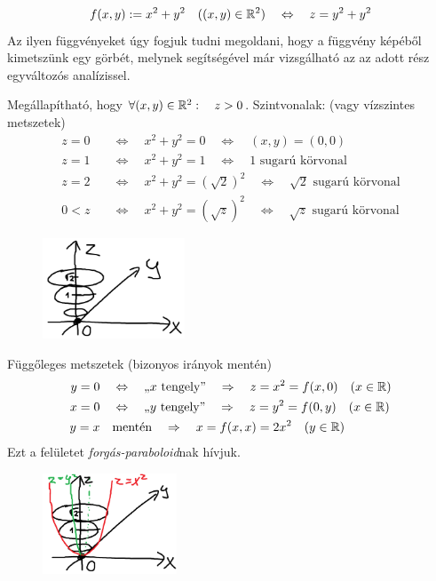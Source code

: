 \documentclass[a4paper,11.5pt]{article}
\begin{document}
	\begin{task}
		\[ f(x,y):=x^2+y^2\quad ((x,y)\in\mathbb{R}^2)\quad \Leftrightarrow\quad z=y^2+y^2 \]
		Az ilyen függvényeket úgy fogjuk tudni megoldani, hogy a függvény képéből kimetszünk egy görbét, melynek segítségével már vizsgálható az az adott rész egyváltozós analízissel.
		
		\medskip
		Megállapítható, hogy $\forall (x,y)\in\mathbb{R}^2:\quad z>0$.
		\smallskip
		Szintvonalak: (vagy vízszintes metszetek)
		\begin{align*}
			z=0&\quad \Leftrightarrow\quad x^2+y^2=0\quad \Leftrightarrow\quad (x,y)=(0,0) \\
			z=1&\quad \Leftrightarrow\quad x^2+y^2=1\quad \Leftrightarrow\quad \text{1 sugarú körvonal} \\
			z=2&\quad \Leftrightarrow\quad x^2+y^2=(\sqrt{2})^2\quad \Leftrightarrow\quad \text{$\sqrt{2}$ sugarú körvonal} \\
			0<z&\quad \Leftrightarrow\quad x^2+y^2=(\sqrt{z})^2\quad \Leftrightarrow\quad \sqrt{z}\text{ sugarú körvonal} 
		\end{align*}
		\begin{figure}[H]
			\centering
			\includegraphics[height=3cm]{../2zh/kepek/18.png}
			\caption{}
		\end{figure}
		Függőleges metszetek (bizonyos irányok mentén)
		\begin{align*}
			y=0&\quad \Leftrightarrow\quad \text{,,$x$ tengely''}\quad \Rightarrow\quad z=x^2=f(x,0)\quad (x\in\mathbb{R}) \\
			x=0&\quad \Leftrightarrow\quad \text{,,$y$ tengely''}\quad \Rightarrow\quad z=y^2=f(0,y)\quad (x\in\mathbb{R}) \\
			y=x&\quad \text{mentén}\quad \Rightarrow\quad x=f(x,x)=2x^2\quad (y\in\mathbb{R}) 
		\end{align*}
		Ezt a felületet \textit{forgás-paraboloid}nak hívjuk.
		\begin{figure}[H]
			\centering
			\includegraphics[height=3cm]{../2zh/kepek/19.png}
			\caption{}
		\end{figure}
	\end{task}
\end{document}
